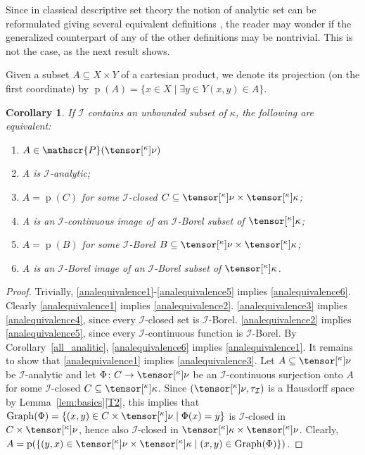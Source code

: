 \documentclass{amsart}
\numberwithin{equation}{section}
\newcommand{\I}{\mathcal{I}}
\newcommand{\pre}[2]{\tensor[^{#1}]{#2}{}}
\newcommand{\1}{\mathbf{I}}
\newcommand{\2}{\mathbf{II}}
\renewcommand{\k}{\kappa}
\newcommand{\proj}{\operatorname{p}}
\newcommand{\pow}{\mathscr{P}}
\newtheorem{corollary}[theorem]{Corollary}
\theoremstyle{definition}
\theoremstyle{remark}
\begin{document}
Since in classical descriptive set theory the notion of analytic set can be reformulated giving several equivalent definitions \cite[Section 14.A]{Kech}, the reader may wonder if the generalized counterpart of any of the other definitions may be nontrivial. This is not the case, as the next result shows.


 Given a subset \(A \subseteq X \times Y\) of a cartesian product, we denote its projection (on the first coordinate) by \(\proj(A)=\{x \in X \mid \exists y \in Y (x,y) \in A \}\). 

\begin{corollary}\label{analequivalence}
	If \(\I\) contains an unbounded subset of \(\k\), the following are equivalent:
	\begin{enumerate}[label={\upshape (\arabic*)}, leftmargin=2pc]
     \item \label{analequivalence6} \(A \in \pow(\pre{\k}{\nu})\)
		\item\label{analequivalence1} A is \(\I\)-analytic;
		\item\label{analequivalence3} \(A = \proj(C)\) for some \(\I\)-closed \(C \subseteq \pre{\kappa}{\nu} \times \pre{\k}{\kappa}\);
        \item\label{analequivalence2} A is an \(\I\)-continuous image of an \(\I\)-Borel subset of \( \pre{\k}{\kappa}\);
		\item\label{analequivalence4} \(A = \proj(B)\) for some \(\I\)-Borel \(B \subseteq \pre{\kappa}{\nu} \times \pre{\k}{\kappa}\);
	\item\label{analequivalence5} A is an \(\I\)-Borel image of an \(\I\)-Borel subset of  \( \pre{\k}{\kappa}\).
\end{enumerate}
\end{corollary}
\begin{proof}
Trivially, \ref{analequivalence1}-\ref{analequivalence5} implies \ref{analequivalence6}.
Clearly \ref{analequivalence1} implies \ref{analequivalence2}. \ref{analequivalence3} implies \ref{analequivalence4}, since every \(\I\)-closed set is \(\I\)-Borel. \ref{analequivalence2} implies \ref{analequivalence5}, since every \(\I\)-continuous function is \(\I\)-Borel. By Corollary~\ref{all_analitic}, \ref{analequivalence6} implies \ref{analequivalence1}. 
    It remains to show that \ref{analequivalence1} implies \ref{analequivalence3}. Let \(A\subseteq \pre{\k}{\nu} \) be \(\I\)-analytic and let \(\Phi \colon C \to \pre{\k}{\nu} \) be an \(\I\)-continuous surjection onto \(A\) for some \(\I\)-closed \(C \subseteq \pre{\k}{\k}\). Since
    \((\pre{\k}{\nu}, \tau_\I)\) is a Hausdorff space by Lemma~\ref{lem:basics}\ref{T2}, this implies that \(\operatorname{Graph}(\Phi)=\{(x,y) \in C \times \pre{\k}{\nu} \mid \Phi(x)=y\}\) is  \(\I\)-closed in \(C \times \pre{\k}{\nu}\), hence also \(\I\)-closed in \(\pre{\k}{\k} \times \pre{\k}{\nu} \). Clearly, \(A=\proj(\{(y,x) \in \pre{\k}{\nu} \times \pre{\k}{\k} \mid (x,y) \in \operatorname{Graph}(\Phi)\})\).
    \end{proof}
\end{document}
